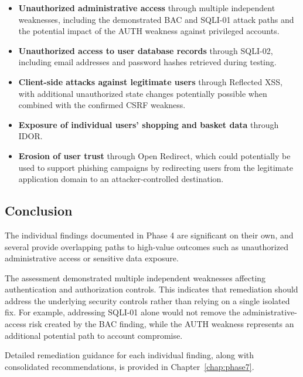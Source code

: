 \begin{itemize}

    \item \textbf{Unauthorized administrative access} through
    multiple independent weaknesses, including the demonstrated BAC
    and SQLI-01 attack paths and the potential impact of the AUTH
    weakness against privileged accounts.

    \item \textbf{Unauthorized access to user database records}
    through SQLI-02, including email addresses and password hashes
    retrieved during testing.

    \item \textbf{Client-side attacks against legitimate users}
    through Reflected XSS, with additional unauthorized state changes
    potentially possible when combined with the confirmed CSRF
    weakness.

    \item \textbf{Exposure of individual users' shopping and basket
    data} through IDOR.

    \item \textbf{Erosion of user trust} through Open Redirect, which
    could potentially be used to support phishing campaigns by
    redirecting users from the legitimate application domain to an
    attacker-controlled destination.

\end{itemize}

\subsection*{Conclusion}

The individual findings documented in Phase 4 are significant on
their own, and several provide overlapping paths to high-value
outcomes such as unauthorized administrative access or sensitive
data exposure.

The assessment demonstrated multiple independent weaknesses affecting
authentication and authorization controls. This indicates that
remediation should address the underlying security controls rather
than relying on a single isolated fix. For example, addressing
SQLI-01 alone would not remove the administrative-access risk created
by the BAC finding, while the AUTH weakness represents an additional
potential path to account compromise.

Detailed remediation guidance for each individual finding, along with
consolidated recommendations, is provided in
Chapter~\ref{chap:phase7}.